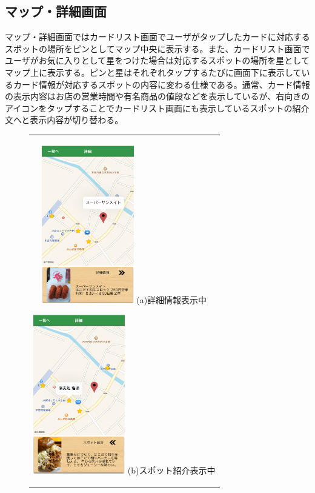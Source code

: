 \subsection{マップ・詳細画面}
マップ・詳細画面ではカードリスト画面でユーザがタップしたカードに対応するスポットの場所をピンとしてマップ中央に表示する。また、カードリスト画面でユーザがお気に入りとして星をつけた場合は対応するスポットの場所を星としてマップ上に表示する。ピンと星はそれぞれタップするたびに画面下に表示しているカード情報が対応するスポットの内容に変わる仕様である。通常、カード情報の表示内容はお店の営業時間や有名商品の値段などを表示しているが、右向きのアイコンをタップすることでカードリスト画面にも表示しているスポットの紹介文へと表示内容が切り替わる。

\addtocounter{figure}{+1}
\begin{figure}[htbp]
  \begin{center}
    \begin{tabular}{c}

      \begin{minipage}{0.33\hsize}
        \begin{center}
\includegraphics[width=4cm, bb=0 0 303 573]{kiko_map1.png}
          \hspace{1cm} (a)詳細情報表示中
        \end{center}
      \end{minipage}

      \begin{minipage}{0.33\hsize}
        \begin{center}
\includegraphics[width=4cm, bb=0 0 304 570]{kiko_map2.png}
          \hspace{1cm} (b)スポット紹介表示中
        \end{center}
      \end{minipage}


\end{tabular}
\end{center}
\end{figure}
